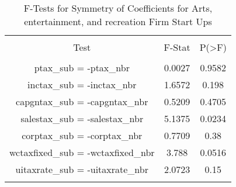 
\begin{table}[!htbp] \centering 
  \caption{F-Tests for Symmetry of Coefficients for Arts, entertainment, and recreation Firm Start Ups} 
  \label{71Ftests} 
\begin{tabular}{@{\extracolsep{5pt}} ccc} 
\\[-1.8ex]\hline 
\hline \\[-1.8ex] 
Test & F-Stat & P(\textgreater F) \\ 
\hline \\[-1.8ex] 
ptax\_sub = -ptax\_nbr & 0.0027 & 0.9582 \\ 
inctax\_sub = -inctax\_nbr & 1.6572 & 0.198 \\ 
capgntax\_sub = -capgntax\_nbr & 0.5209 & 0.4705 \\ 
salestax\_sub = -salestax\_nbr & 5.1375 & 0.0234 \\ 
corptax\_sub = -corptax\_nbr & 0.7709 & 0.38 \\ 
wctaxfixed\_sub = -wctaxfixed\_nbr & 3.788 & 0.0516 \\ 
uitaxrate\_sub = -uitaxrate\_nbr & 2.0723 & 0.15 \\ 
\hline \\[-1.8ex] 
\end{tabular} 
\end{table} 
